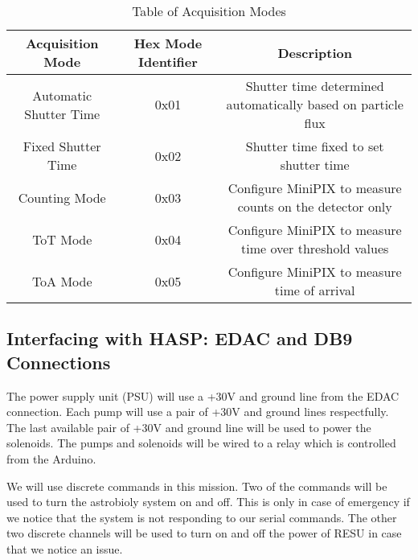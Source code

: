 \begin{table}[!ht]
\centering
\caption{Table of Acquisition Modes} 
\label{tab:Acq-Commands}
\bigskip
\begin{tabular}{|c|c|c|}
\hline
\multicolumn{1}{|c|}{\bfseries Acquisition Mode} & \multicolumn{1}{c|}{\bfseries Hex Mode Identifier} & \multicolumn{1}{c|}{\bfseries Description}\\
\hline
    Automatic Shutter Time	& 0x01   & Shutter time determined automatically based on particle flux   \\ \hline %
    Fixed Shutter Time    	& 0x02 	 & Shutter time fixed to set shutter time 	     		  \\ \hline
    Counting Mode    		& 0x03 	 & Configure MiniPIX to measure counts on the detector only 	  \\ \hline
    ToT Mode			& 0x04	 & Configure MiniPIX to measure time over threshold values	  \\ \hline
    ToA Mode			& 0x05 	 & Configure MiniPIX to measure time of arrival 	     	  \\ \hline
\end{tabular}
\medskip
\end{table}


\subsection{Interfacing with HASP: EDAC and DB9 Connections}

The power supply unit (PSU) will use a +30V and ground line from the EDAC connection.  Each pump will use a pair of +30V and ground lines respectfully.  The last available pair of +30V and ground line will be used to power the solenoids.  The pumps and solenoids will be wired to a relay which is controlled from the Arduino. 

We will use discrete commands in this mission.  Two of the commands will be used to turn the astrobioly system on and off.  This is only in case of emergency if we notice that the system is not responding to our serial commands.  The other two discrete channels will be used to turn on and off the power of RESU in case that we notice an issue.

